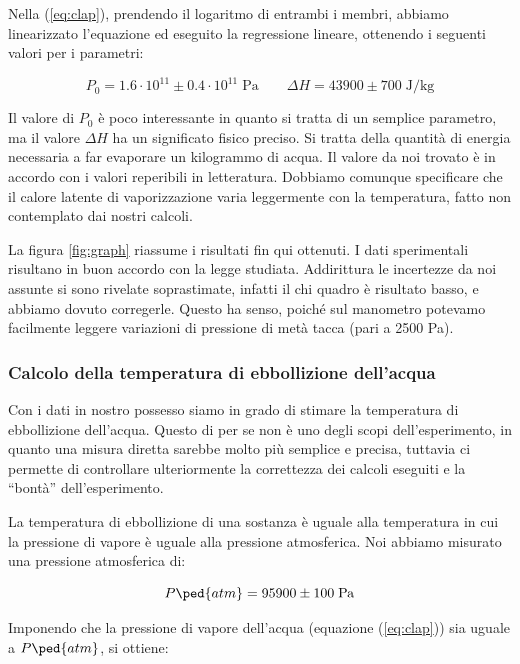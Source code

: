 Nella (\ref{eq:clap}), prendendo il logaritmo di entrambi i membri, abbiamo linearizzato
l'equazione ed eseguito la regressione lineare, ottenendo i seguenti valori per i parametri:

\begin{equation}
    P_0 = 1.6 \cdot 10^{11} \pm 0.4 \cdot 10^{11} \; \si{\pascal} \qquad \Delta H = 43900 \pm  700 \; \si{\joule\per\kilo\gram} 
\end{equation}

Il valore di $P_0$ è poco interessante in quanto si tratta di un semplice parametro, ma il valore
$\Delta H$ ha un significato fisico preciso. Si tratta della quantità di energia necessaria a far evaporare un kilogrammo
di acqua. Il valore da noi trovato è in accordo con i valori reperibili in letteratura. Dobbiamo
comunque specificare che il calore latente di vaporizzazione varia leggermente con la temperatura,
fatto non contemplato dai nostri calcoli.

La figura \ref{fig:graph} riassume i risultati fin qui ottenuti. I dati sperimentali risultano in buon accordo
con la legge studiata. Addirittura le incertezze da noi assunte si sono rivelate soprastimate, infatti
il chi quadro è risultato basso, e abbiamo dovuto corregerle. Questo ha senso, poiché sul manometro potevamo facilmente
leggere variazioni di pressione di metà tacca (pari a 2500 \si{\pascal}).


\subsubsection{Calcolo della temperatura di ebbollizione dell'acqua}

Con i dati in nostro possesso siamo in grado di stimare la temperatura di ebbollizione dell'acqua.
Questo di per se non è uno degli scopi dell'esperimento, in quanto una misura diretta sarebbe molto
più semplice e precisa, tuttavia ci permette di controllare ulteriormente la correttezza dei calcoli
eseguiti e la ``bontà'' dell'esperimento.

La temperatura di ebbollizione di una sostanza è uguale alla temperatura in cui la pressione di vapore
è uguale alla pressione atmosferica. Noi abbiamo misurato una pressione atmosferica di:

\begin{equation}
    P\ped{atm} =  95900 \pm 100 \; \si{\pascal}
\end{equation}

Imponendo che la pressione di vapore dell'acqua (equazione (\ref{eq:clap})) sia uguale a $P\ped{atm}$, si ottiene:

